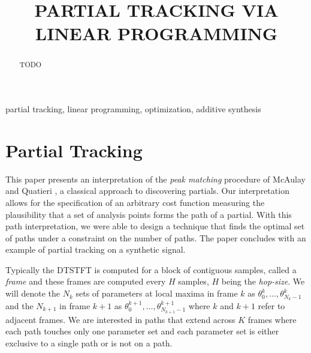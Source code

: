 \documentclass{article}
\title{PARTIAL TRACKING VIA LINEAR PROGRAMMING}
\begin{document}
\ninept
\maketitle

\begin{sloppy}

\begin{abstract}
    TODO
\end{abstract}

\begin{keywords}
partial tracking, linear programming, optimization, additive synthesis
\end{keywords}

\section{Partial Tracking\label{chap:partialtracking}}


This paper presents an interpretation of the \textit{peak matching} procedure
of McAulay and Quatieri \cite{mcaulay1986speech}, a classical approach to discovering partials. Our
interpretation allows for the specification of an arbitrary cost function
measuring the plausibility that a set of analysis points forms the path of a
partial. With this path interpretation, we were able to design a technique that finds the
optimal set of paths under a constraint on the number of paths. The paper 
concludes with an example of partial tracking on a synthetic signal.

Typically the DTSTFT is computed for a block of contiguous samples, called a
\textit{frame} and these frames are computed every $H$ samples, $H$ being the
\textit{hop-size}. We will denote the $N_{k}$ sets of parameters at local maxima in
frame $k$ as $\theta_0^{k}, \dotsc, \theta_{N_{k}-1}^{k}$ and the $N_{k+1}$ in frame $k+1$
as $\theta_0^{k+1}, \dotsc, \theta_{N_{k+1}-1}^{k+1}$ where $k$ and $k+1$ refer to
adjacent frames. We are interested in paths that extend across $K$ frames where
each path touches only one parameter set and each parameter set is either
exclusive to a single path or is not on a path.


\end{sloppy}
\end{document}
